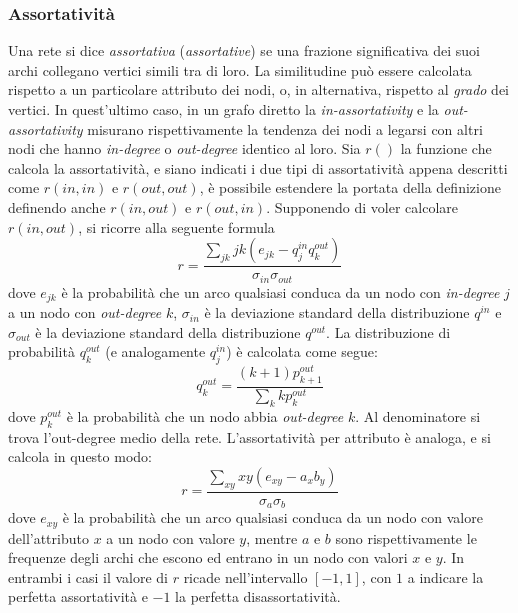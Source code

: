 \documentclass[a4paper,12pt]{article}
\begin{document}
\subsubsection{Assortatività}
Una rete si dice \textit{assortativa} (\textit{assortative}) \cite{newman} se 
una frazione significativa dei suoi archi collegano vertici simili tra di loro. La similitudine può essere calcolata rispetto a un particolare attributo dei nodi, o, in alternativa, rispetto al \textit{grado} dei vertici. In quest'ultimo caso, in un grafo diretto \cite{assor} la \textit{in-assortativity} e la \textit{out-assortativity} misurano rispettivamente la tendenza dei nodi a legarsi con altri nodi che hanno \textit{in-degree} o \textit{out-degree} identico al loro. Sia $r()$ la funzione che calcola la assortatività, e siano indicati i due tipi di assortatività appena descritti come $r(in,in)$ e $r(out,out)$, è possibile estendere la portata della definizione definendo anche $r(in,out)$ e $r(out,in)$. Supponendo di voler calcolare $r(in,out)$, si ricorre alla seguente formula \cite{mixing}
\begin{equation}
r=\dfrac{\sum_{jk}jk(e_{jk}-q^{in}_jq^{out}_k)}{\sigma_{in}\sigma_{out}}
\end{equation}
dove $e_{jk}$ è la probabilità che un arco qualsiasi conduca da un nodo con \textit{in-degree} $j$ a un nodo con \textit{out-degree} $k$, $\sigma_{in}$ è la deviazione standard della distribuzione $q^{in}$ e $\sigma_{out}$ è la deviazione standard della distribuzione $q^{out}$. La distribuzione di probabilità $q^{out}_k$ (e analogamente $q^{in}_j$) è calcolata come segue:
\begin{equation}
q^{out}_k=\dfrac{(k+1)p^{out}_{k+1}}{\sum_kkp^{out}_k}
\end{equation}
dove $p^{out}_k$ è la probabilità che un nodo abbia \textit{out-degree} $k$. Al denominatore si trova l'out-degree medio della rete.
L'assortatività per attributo è analoga, e si calcola in questo modo:
\begin{equation}
r=\dfrac{\sum_{xy}xy(e_{xy}-a_xb_y)}{\sigma_a\sigma_b}
\end{equation}
dove $e_{xy}$ è la probabilità che un arco qualsiasi conduca da un nodo con valore dell'attributo $x$ a un nodo con valore $y$, mentre $a$ e $b$ sono rispettivamente le frequenze degli archi che escono ed entrano in un nodo con valori $x$ e $y$. In entrambi i casi il valore di $r$ ricade nell'intervallo $[-1,1]$, con $1$ a indicare la perfetta assortatività e $-1$ la perfetta disassortatività.   
\end{document}
